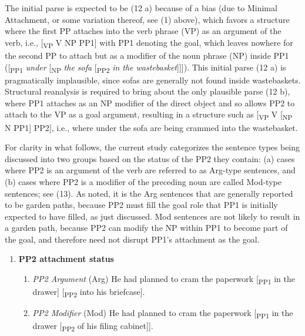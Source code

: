 \documentclass[11pt,oneside]{book}
\providecommand{\tightlist}{%
  \setlength{\itemsep}{0pt}\setlength{\parskip}{0pt}}
\begin{document}
The initial parse is expected to be (12 a) because of a bias (due to Minimal Attachment, or some variation thereof, see (1) above), which favors a structure where the first PP attaches into the verb phrase (VP) as an argument of the verb, i.e., {[}\textsubscript{VP} V NP PP1{]} with PP1 denoting the goal, which leaves nowhere for the second PP to attach but as a modifier of the noun phrase (NP) inside PP1 ({[}\textsubscript{PP1} \emph{under} {[}\textsubscript{NP} \emph{the sofa} {[}\textsubscript{PP2} \emph{in the wastebasket}{]}{]}{]}). This initial parse (12 a) is pragmatically implausible, since sofas are generally not found inside wastebaskets. Structural reanalysis is required to bring about the only plausible parse (12 b), where PP1 attaches as an NP modifier of the direct object and so allows PP2 to attach to the VP as a goal argument, resulting in a structure such as {[}\textsubscript{VP} V {[}\textsubscript{NP} N PP1{]} PP2{]}, i.e., where under the sofa are being crammed into the wastebasket.

For clarity in what follows, the current study categorizes the sentence types being discussed into two groups based on the status of the PP2 they contain: (a) cases where PP2 is an argument of the verb are referred to as Arg-type sentences, and (b) cases where PP2 is a modifier of the preceding noun are called Mod-type sentences; see (13). As noted, it is the Arg sentences that are generally reported to be garden paths, because PP2 must fill the goal role that PP1 is initially expected to have filled, as just discussed. Mod sentences are not likely to result in a garden path, because PP2 can modify the NP within PP1 to become part of the goal, and therefore need not disrupt PP1's attachment as the goal.

\begin{enumerate}
\def\labelenumi{(\arabic{enumi})}
\setcounter{enumi}{12}
\tightlist
\item
  \textbf{PP2 attachment status} \linebreak\nopagebreak

  \begin{enumerate}
  \def\labelenumii{(\alph{enumii})}
  \tightlist
  \item
    \emph{PP2 Argument} (Arg) \linebreak\nopagebreak
    He had planned to cram the paperwork {[}\textsubscript{PP1} in the drawer{]} {[}\textsubscript{PP2} into his briefcase{]}.
  \item
    \emph{PP2 Modifier} (Mod) \linebreak\nopagebreak
    He had planned to cram the paperwork {[}\textsubscript{PP1} in the drawer {[}\textsubscript{PP2} of his filing cabinet{]}{]}.
  \end{enumerate}
\end{enumerate}
\end{document}
